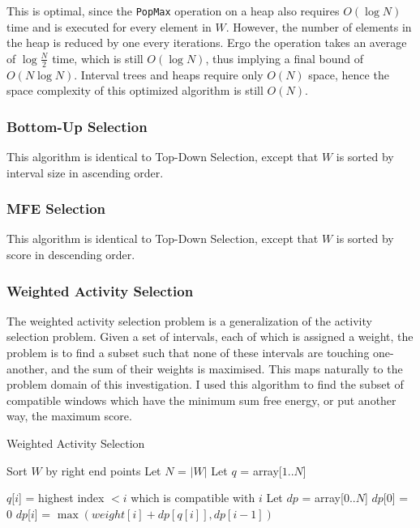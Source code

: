 \documentclass{cshonours}
\begin{document}
This is optimal, since the \texttt{PopMax} operation on a heap also requires $O(\log N)$ time and is executed for every element in $W$. However, the number of elements in the heap is reduced by one every iterations. Ergo the operation takes an average of $\log \frac{N}{2}$ time, which is still $O(\log N)$, thus implying a final bound of $O(N \log N)$. Interval trees and heaps require only $O(N)$ space, hence the space complexity of this optimized algorithm is still $O(N)$.


\subsubsection{Bottom-Up Selection}
This algorithm is identical to Top-Down Selection, except that $W$ is sorted by interval size in ascending order.

\subsubsection{MFE Selection}
This algorithm is identical to Top-Down Selection, except that $W$ is sorted by score in descending order.


\subsubsection{Weighted Activity Selection}
The weighted activity selection problem is a generalization of the activity selection problem. Given a set of intervals, each of which is assigned a weight, the problem is to find a subset such that none of these intervals are touching one-another, and the sum of their weights is maximised. This maps naturally to the problem domain of this investigation. I used this algorithm to find the subset of compatible windows which have the minimum sum free energy, or put another way, the maximum score.

\begin{algorithm}
  \caption{Weighted Activity Selection}
  \label{was}
  \begin{algorithmic}[1]
  \State Sort $W$ by right end points
  \State Let $N$ = $|W|$
  \State Let $q$ = array[$1..N$]
  
  	\State $q$[$i$] = highest index $< i$ which is compatible with $i$
  \EndFor
  \State Let $dp$ = array[$0..N$]  
  \State $dp$[0] = 0
  	\State $dp$[$i$] = $\max (weight[i] + dp[q[i]], dp[i-1])$
  \EndFor
  \end{algorithmic}
\end{algorithm}
\end{document}
